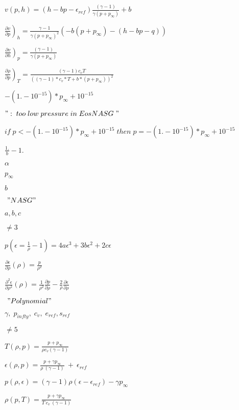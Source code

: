 \documentclass{article}
\begin{document}
$ v(p,h) = (h - bp -\epsilon_{ref})\frac{(\gamma-1)}{\gamma (p+p_{\infty})}+b $
\pagebreak

$ \left. \frac{\partial v}{\partial p} \right)_h = \frac{\gamma-1}{\gamma (p+p_{\infty})^2} \left(-b(p+p_{\infty})-(h-bp-q)\right) $
\pagebreak

$ \left. \frac{\partial v}{\partial h} \right)_p =  \frac{(\gamma-1)}{\gamma (p+p_{\infty})} $
\pagebreak

$ \left. \frac{\partial \rho}{\partial p} \right)_T = \frac{(\gamma -1) c_v T}{\left((\gamma - 1)* c_v * T + b * (p + p_{\infty})\right)^2} $
\pagebreak

$ -(1. - 10^{-15})*p_{\infty} +  10^{-15} $
\pagebreak

$ " :\;too\;low\;pressure \;in\; EosNASG\;"$
\pagebreak

$ if \; p < -(1. - 10^{-15})*p_{\infty} +  10^{-15} \; then \;  p= -(1. - 10^{-15})*p_{\infty} +  10^{-15} $
\pagebreak

$ \frac{1.}{b} - 1. $
\pagebreak

$ \alpha $
\pagebreak

$ p_{\infty} $
\pagebreak

$ b $
\pagebreak

$ \ "NASG" $
\pagebreak

$ a, b, c$
\pagebreak

$ \neq 3$
\pagebreak

$ p (\epsilon = \frac{1}{\rho} - 1) = 4 a \epsilon^3 + 3 b \epsilon^2 + 2 c \epsilon $
\pagebreak

$ \frac{\partial \epsilon}{\partial \rho} (\rho) = \frac{p}{\rho^2} $
\pagebreak

$ \frac{\partial^2 \epsilon}{\partial \rho^2} (\rho) = \frac{1}{\rho^2} \frac{\partial p}{\partial \rho} - \frac{2}{\rho} \frac{\partial \epsilon}{\partial \rho} $
\pagebreak

$ \ "Polynomial" $
\pagebreak

$ \gamma, \; p_{infty}, \; c_v, \; e_{ref},  s_{ref}$
\pagebreak

$ \neq 5$
\pagebreak

$  T(\rho, p)  =   \frac{p+p_{\infty}}{\rho c_v (\gamma-1)}$
\pagebreak

$  \epsilon (\rho, p)  = \frac{p + \gamma p_{\infty}}{\rho \ (\gamma-1)} \ + \ \epsilon_{ref} $
\pagebreak

$  p(\rho, \epsilon)  = (\gamma-1)\rho(\epsilon  - \epsilon_{ref}) - \gamma p_{\infty}$
\pagebreak

$  \rho(p, T)  =  \frac{p + \gamma p_{\infty} }{T \ c_v \ (\gamma-1)}\ $
\pagebreak
\end{document}
